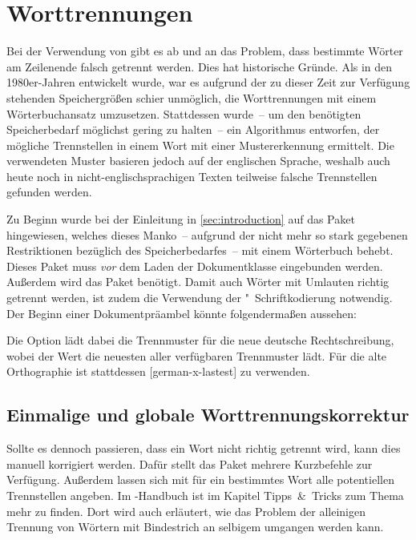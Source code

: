 \documentclass[%
  english,ngerman,%
  geometry=no,DIV=12,automark,%
]{tudscrartcl}
\begin{document}
\section{Worttrennungen}
\label{sec:hyphenation}
Bei der Verwendung von  gibt es ab und an das Problem, dass 
bestimmte Wörter am Zeilenende falsch getrennt werden. Dies hat historische 
Gründe. Als  in den 1980er-Jahren entwickelt wurde, war es aufgrund 
der zu dieser Zeit zur Verfügung stehenden Speichergrößen schier unmöglich, die 
Worttrennungen mit einem Wörterbuchansatz umzusetzen. Stattdessen wurde~-- um 
den benötigten Speicherbedarf möglichst gering zu halten~-- ein Algorithmus 
entworfen, der mögliche Trennstellen in einem Wort mit einer Mustererkennung 
ermittelt. Die verwendeten Muster basieren jedoch auf der englischen Sprache, 
weshalb auch heute noch in nicht-englischsprachigen Texten teilweise falsche 
Trennstellen gefunden werden.

Zu Beginn wurde bei der Einleitung in \autoref{sec:introduction} auf das Paket 
 hingewiesen, welches dieses Manko~-- aufgrund der nicht 
mehr so stark gegebenen Restriktionen bezüglich des Speicherbedarfes~-- mit 
einem Wörterbuch behebt. Dieses Paket muss \emph{vor} dem Laden der 
Dokumentklasse eingebunden werden. Außerdem wird das Paket  
benötigt. Damit auch Wörter mit Umlauten richtig getrennt werden, ist zudem die 
Verwendung der "~Schriftkodierung notwendig. Der Beginn einer 
Dokumentpräambel könnte folgendermaßen aussehen:
%
%
Die Option  lädt dabei die Trennmuster für die neue deutsche 
Rechtschreibung, wobei der Wert  die neuesten aller 
verfügbaren Trennmuster lädt. Für die alte Orthographie ist stattdessen 
[german-x-lastest] zu verwenden.


\subsection{Einmalige und globale Worttrennungskorrektur}
Sollte es dennoch passieren, dass ein Wort nicht richtig getrennt wird, kann 
dies manuell korrigiert werden. Dafür stellt das Paket  mehrere 
Kurzbefehle zur Verfügung. Außerdem lassen sich mit  für ein 
bestimmtes Wort alle potentiellen Trennstellen angeben. Im \TUDScript-Handbuch
ist im Kapitel Tipps~\&~Tricks zum Thema  mehr zu finden. Dort wird auch 
erläutert, wie das Problem der alleinigen Trennung von Wörtern mit Bindestrich 
an selbigem umgangen werden kann.
\end{document}
